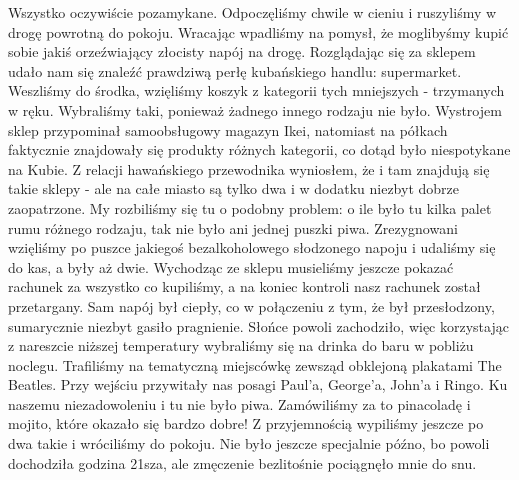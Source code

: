 Wszystko oczywiście pozamykane. 
Odpoczęliśmy chwile w cieniu i ruszyliśmy w drogę powrotną do pokoju.
Wracając wpadliśmy na pomysł, że moglibyśmy kupić sobie jakiś orzeźwiający złocisty napój na drogę. 
Rozglądając się za sklepem udało nam się znaleźć prawdziwą perłę kubańskiego handlu: supermarket.
Weszliśmy do środka, wzięliśmy koszyk z kategorii tych mniejszych - trzymanych w ręku. 
Wybraliśmy taki, ponieważ żadnego innego rodzaju nie było. 
Wystrojem sklep przypominał samoobsługowy magazyn Ikei, natomiast na półkach faktycznie znajdowały się produkty różnych kategorii, co dotąd było niespotykane na Kubie. 
Z relacji hawańskiego przewodnika wyniosłem, że i tam znajdują się takie sklepy - ale na całe miasto są tylko dwa i w dodatku niezbyt dobrze zaopatrzone. 
My rozbiliśmy się tu o podobny problem: o ile było tu kilka palet rumu różnego rodzaju, tak nie było ani jednej puszki piwa. 
Zrezygnowani wzięliśmy po puszce jakiegoś bezalkoholowego słodzonego napoju i udaliśmy się do kas, a były aż dwie. 
Wychodząc ze sklepu musieliśmy jeszcze pokazać rachunek za wszystko co kupiliśmy, a na koniec kontroli nasz rachunek został przetargany. 
Sam napój był ciepły, co w połączeniu z tym, że był przesłodzony, sumarycznie niezbyt gasiło pragnienie. 
Słońce powoli zachodziło, więc korzystając z nareszcie niższej temperatury wybraliśmy się na drinka do baru w pobliżu noclegu.
Trafiliśmy na tematyczną miejscówkę zewsząd obklejoną plakatami The Beatles. 
Przy wejściu przywitały nas posagi Paul’a, George’a, John’a i Ringo.
Ku naszemu niezadowoleniu i tu nie było piwa.
Zamówiliśmy za to pinacoladę i mojito, które okazało się bardzo dobre! 
Z przyjemnością wypiliśmy jeszcze po dwa takie i wróciliśmy do pokoju.
Nie było jeszcze specjalnie późno, bo powoli dochodziła godzina 21sza, ale zmęczenie bezlitośnie pociągnęło mnie do snu.
